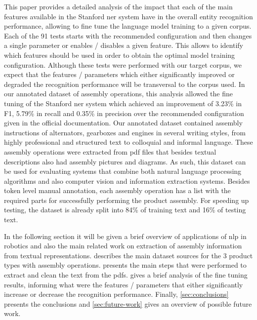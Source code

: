 This paper provides a detailed analysis of the impact that each of the main features available in the Stanford \gls{ner} system have in the overall entity recognition performance, allowing to fine tune the language model training to a given corpus. Each of the 91 tests starts with the recommended configuration and then changes a single parameter or enables / disables a given feature. This allows to identify which features should be used in order to obtain the optimal model training configuration. Although these tests were performed with our target corpus, we expect that the features / parameters which either significantly improved or degraded the recognition performance will be transversal to the corpus used. In our annotated dataset of assembly operations, this analysis allowed the fine tuning of the Stanford \gls{ner} system which achieved an improvement of 3.23\% in F1, 5.79\% in recall and 0.35\% in precision over the recommended configuration given in the official documentation. Our annotated dataset contained assembly instructions of alternators, gearboxes and engines in several writing styles, from highly professional and structured text to colloquial and informal language. These assembly operations were extracted from \gls{pdf} files that besides textual descriptions also had assembly pictures and diagrams. As such, this dataset can be used for evaluating systems that combine both natural language processing algorithms and also computer vision and information extraction systems. Besides token level manual annotation, each assembly operation has a list with the required parts for successfully performing the product assembly. For speeding up testing, the dataset is already split into 84\% of training text and 16\% of testing text.

In the following section it will be given a brief overview of applications of \gls{nlp} in robotics and also the main related work on extraction of assembly information from textual representations.  describes the main dataset sources for the 3 product types with assembly operations.  presents the main steps that were performed to extract and clean the text from the \glspl{pdf}.  gives a brief analysis of the fine tuning results, informing what were the features / parameters that either significantly increase or decrease the recognition performance. Finally, \cref{sec:conclusions} presents the conclusions and \cref{sec:future-work} gives an overview of possible future work.
